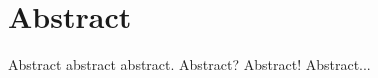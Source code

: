 
\cleardoublepage
\thispagestyle{empty} %

\chapter*{Abstract} %

Abstract abstract abstract. Abstract? Abstract! Abstract...

\cleardoublepage
